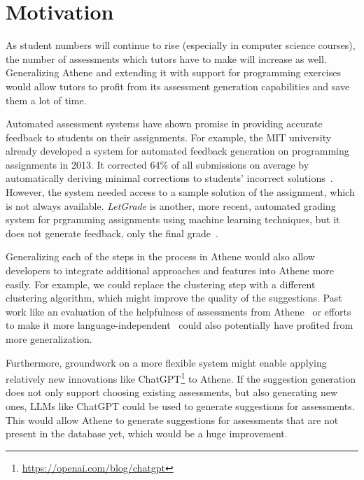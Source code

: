 \section{Motivation}

As student numbers will continue to rise (especially in computer science courses), the number of assessments which tutors have to make will increase as well.
Generalizing Athene and extending it with support for programming exercises would allow tutors to profit from its assessment generation capabilities and save them a lot of time.

Automated assessment systems have shown promise in providing accurate feedback to students on their assignments.
For example, the MIT university already developed a system for automated feedback generation on programming assignments in 2013. It corrected 64\% of all submissions on average by automatically deriving minimal corrections to students' incorrect solutions~\cite{singh2013automated}. However, the system needed access to a sample solution of the assignment, which is not always available. 
\textit{LetGrade} is another, more recent, automated grading system for prgramming assignments using machine learning techniques, but it does not generate feedback, only the final grade~\cite{messer2022grading}.

Generalizing each of the steps in the process in Athene would also allow developers to integrate additional approaches and features into Athene more easily.
For example, we could replace the clustering step with a different clustering algorithm, which might improve the quality of the suggestions. Past work like an evaluation of the helpfulness of assessments from Athene~\cite{atheneTracking} or efforts to make it more language-independent~\cite{atheneLanguage} could also potentially have profited from more generalization.

Furthermore, groundwork on a more flexible system might enable applying relatively new innovations like ChatGPT\footnote{\url{https://openai.com/blog/chatgpt}} to Athene. If the suggestion generation does not only support choosing existing assessments, but also generating new ones, LLMs like ChatGPT could be used to generate suggestions for assessments. This would allow Athene to generate suggestions for assessments that are not present in the database yet, which would be a huge improvement.

